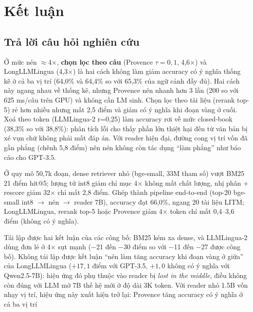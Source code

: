 \section{Kết luận}
\label{sec:conclusion}

\subsection{Trả lời câu hỏi nghiên cứu}

\begin{description}[leftmargin=2.6em,labelindent=0pt]
  \item[RQ1.] Ở mức nén $\approx$4$\times$, \textbf{chọn lọc theo câu} (Provence $\tau=0{,}1$, 4,6$\times$)
  và LongLLMLingua (4,3$\times$) là hai cách không làm giảm accuracy có ý nghĩa thống kê ở cả ba vị trí
  (64,0\% và 64,4\% so với 65,3\% của ngữ cảnh đầy đủ). Hai cách này ngang nhau về thống kê, nhưng
  Provence nén nhanh hơn 3 lần (200 so với 625 ms/câu trên GPU) và không cần LM sinh. Chọn lọc theo tài liệu (rerank top-5) rẻ hơn nhiều nhưng mất 2,5 điểm và giảm
  có ý nghĩa khi đoạn vàng ở cuối. Xoá theo token (LLMLingua-2 r=0,25) làm accuracy rơi về mức
  closed-book (38,3\% so với 38,8\%): phân tích lỗi cho thấy phần lớn thiệt hại đến từ văn bản bị xé
  vụn chứ không phải mất đáp án. Với reader hiện đại, đường cong vị trí vốn đã gần phẳng (chênh 5,8
  điểm) nên nén không còn tác dụng ``làm phẳng'' như báo cáo cho GPT-3.5.
  \item[RQ2.] Ở quy mô 50,7k đoạn, dense retriever nhỏ (bge-small, 33M tham số) vượt BM25 21 điểm
  hit@5; lượng tử int8 giảm chỉ mục 4$\times$ không mất chất lượng, nhị phân + rescore giảm 32$\times$
  chỉ mất 2,8 điểm. Ghép thành pipeline end-to-end (top-20 bge-small int8 $\to$ nén $\to$ reader 7B),
  accuracy đạt 66,0\%, ngang 20 tài liệu LITM; LongLLMLingua, rerank top-5 hoặc Provence giảm
  4$\times$ token chỉ mất 0,4--3,6 điểm (không có ý nghĩa).
  \item[RQ3.] Tái lập được hai kết luận của các công bố: BM25 kém xa dense, và LLMLingua-2 dùng đơn lẻ
  ở 4$\times$ sụt mạnh ($-$21 đến $-$30 điểm so với $-$11 đến $-$27 được công bố). Không tái lập được
  kết luận ``nén làm tăng accuracy khi đoạn vàng ở giữa'' của LongLLMLingua ($+17{,}1$ điểm với GPT-3.5,
  $+1{,}0$ không có ý nghĩa với Qwen2.5-7B): hiệu ứng đó phụ thuộc vào reader bị \emph{lost in the
  middle}, điều không còn đúng với LLM mở 7B thế hệ mới ở độ dài 3K token. Với reader nhỏ 1.5B vốn nhạy
  vị trí, hiệu ứng này xuất hiện trở lại: Provence tăng accuracy có ý nghĩa ở cả ba vị trí

\end{description}
